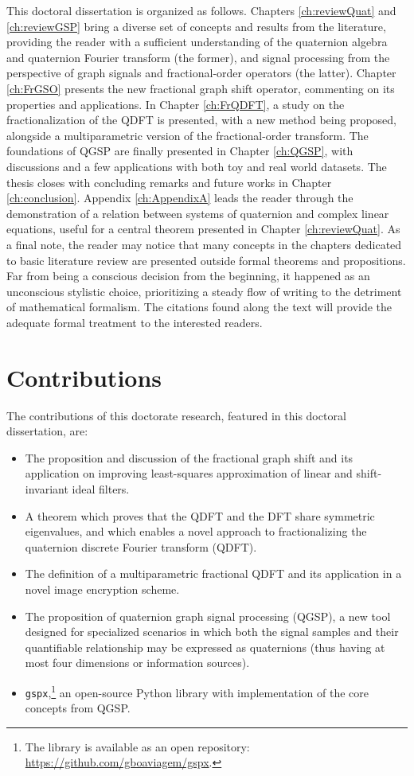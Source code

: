 This doctoral dissertation is organized as follows. Chapters \ref{ch:reviewQuat} and \ref{ch:reviewGSP} bring a diverse set of concepts and results from the literature, providing the reader with a sufficient understanding of the quaternion algebra and quaternion Fourier transform (the former), and signal processing from the perspective of graph signals and fractional-order operators (the latter).
Chapter \ref{ch:FrGSO} presents the new fractional graph shift operator, commenting on its properties and applications.
In Chapter \ref{ch:FrQDFT}, a study on the fractionalization of the QDFT is presented, with a new method being proposed, alongside a multiparametric version of the fractional-order transform.
The foundations of QGSP are finally presented in Chapter \ref{ch:QGSP}, with discussions and a few applications with both toy and real world datasets.
The thesis closes with concluding remarks and future works in Chapter \ref{ch:conclusion}. Appendix \ref{ch:AppendixA} leads the reader through the demonstration of a relation between systems of quaternion and complex linear equations, useful for a central theorem presented in Chapter \ref{ch:reviewQuat}. As a final note, the reader may notice that many concepts in the chapters dedicated to basic literature review are presented outside formal theorems and propositions. Far from being a conscious decision from the beginning, it happened as an unconscious stylistic choice, prioritizing a steady flow of writing to the detriment of mathematical formalism. The citations found along the text will provide the adequate formal treatment to the interested readers.

\section{Contributions}
The contributions of this doctorate research, featured in this doctoral dissertation, are:

\vspace{-1em}
\begin{itemize}[noitemsep]
    \item The proposition and discussion of the fractional graph shift and its application on improving least-squares approximation of linear and shift-invariant ideal filters.
    \item A theorem which proves that the QDFT and the DFT share symmetric eigenvalues, and which enables a novel approach to fractionalizing the quaternion discrete Fourier transform (QDFT).
    \item The definition of a multiparametric fractional QDFT and its application in a novel image encryption scheme.
    \item The proposition of quaternion graph signal processing (QGSP), a new tool designed for specialized scenarios in which both the signal samples and their quantifiable relationship may be expressed as quaternions (thus having at most four dimensions or information sources).
    \item \texttt{gspx},\footnote{The library is available as an open repository: \url{https://github.com/gboaviagem/gspx}.} an open-source Python library with implementation of the core concepts from QGSP.
\end{itemize}
\vspace{-1em}
